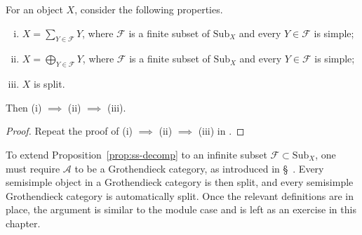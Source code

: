 \begin{proposition}\label{prop:ss-decomp}
	For an object $X$, consider the following properties.
	\begin{enumerate}[(i)]
		\item $X=\sum_{Y\in\mathcal{F}}Y$, where $\mathcal{F}$ is a finite
		subset of $\mathrm{Sub}_X$ and every $Y\in\mathcal{F}$ is simple;
		\item $X=\bigoplus_{Y\in\mathcal{F}}Y$, where $\mathcal{F}$ is a
		finite subset of $\mathrm{Sub}_X$ and every $Y\in\mathcal{F}$ is
		simple;
		\item $X$ is split.
	\end{enumerate}
	Then (i) $\implies$ (ii) $\implies$ (iii).
\end{proposition}
\begin{proof}
	Repeat the proof of (i) $\implies$ (ii) $\implies$ (iii) in
	\cite[Proposition 6.11.4]{Li1}.
\end{proof}

\begin{remark}\label{rem:Grothendieck-ss-decomp}
	To extend Proposition~\ref{prop:ss-decomp} to an infinite subset
	$\mathcal{F}\subset\mathrm{Sub}_X$, one must require $\mathcal{A}$ to be
	a Grothendieck category, as introduced in
	\S~. Every semisimple object in
	a Grothendieck category is then split, and every semisimple Grothendieck
	category is automatically split. Once the relevant definitions are in
	place, the argument is similar to the module case and is left as an
	exercise in this chapter.
\end{remark}
